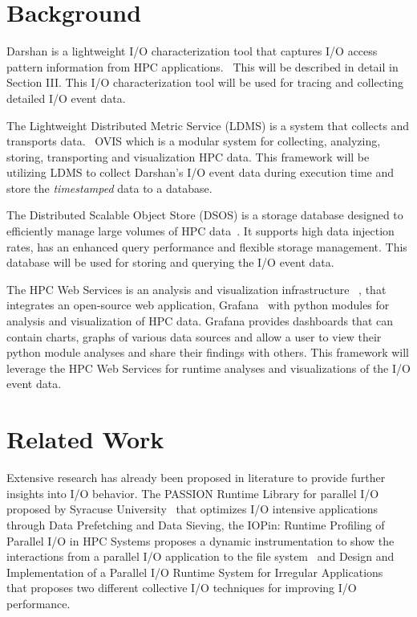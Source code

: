 \documentclass[conference]{IEEEtran}
\begin{document}
\section{Background}
Darshan is a lightweight I/O characterization tool that captures I/O access pattern information from HPC applications.~\cite{Darshan} This will be described in detail in Section III. This I/O characterization tool will be used for tracing and collecting detailed I/O event data.

The Lightweight Distributed Metric Service (LDMS) is a system that collects and transports data.~\cite{ovisweb} OVIS which is a modular system for collecting, analyzing, storing, transporting and visualization HPC data. This framework will be utilizing LDMS to collect Darshan's I/O event data during execution time and store the \emph{timestamped} data to a database.

The Distributed Scalable Object Store (DSOS) is a storage database designed to efficiently manage large volumes of HPC data~\cite{sosgithub}. It supports high data injection rates, has an enhanced query performance and flexible storage management. This database will be used for storing and querying the I/O event data. 

The HPC Web Services is an analysis and visualization infrastructure ~\cite{ClusterAV}, that integrates an open-source web application, Grafana~\cite{grafana-website} with python modules for analysis and visualization of HPC data. Grafana provides dashboards that can contain charts, graphs of various data sources and allow a user to view their python module analyses and share their findings with others. This framework will leverage the HPC Web Services for runtime analyses and visualizations of the I/O event data.

\section{Related Work}
Extensive research has already been proposed in literature to provide further insights into I/O behavior. The PASSION Runtime Library for parallel I/O proposed by Syracuse University~\cite{RuntimeLibrary-ParallelI/O} that optimizes I/O intensive applications through Data Prefetching and Data Sieving, the IOPin: Runtime Profiling of Parallel I/O in HPC
Systems proposes a dynamic instrumentation to show the interactions from a parallel I/O application to the file system~\cite{HPC-IO-Runtime} and Design and Implementation of a Parallel I/O Runtime System for Irregular Applications~\cite{RuntimeLibrary-IrregularApps} that proposes two different collective I/O techniques for improving I/O performance.
\end{document}
